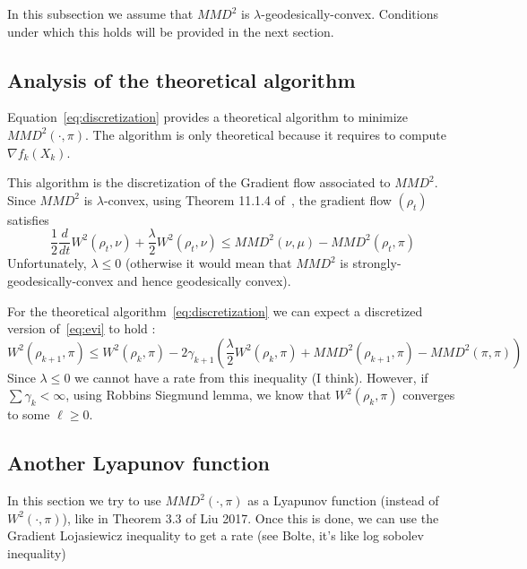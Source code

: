 In this subsection we assume that $MMD^2$ is $\lambda$-geodesically-convex. Conditions under which this holds will be provided in the next section.

\subsection{Analysis of the theoretical algorithm}

Equation~\eqref{eq:discretization} provides a theoretical algorithm to minimize $MMD^2(\cdot,\pi)$. The algorithm is only theoretical because it requires to compute $\nabla f_k(X_k)$.

This algorithm is the discretization of the Gradient flow associated to $MMD^2$. Since $MMD^2$ is $\lambda$-convex, using Theorem 11.1.4 of~\cite{ambrosio2008gradient}, the gradient flow $(\rho_t)$ satisfies
\begin{equation}
    \label{eq:evi}
    \frac12 \frac{d}{dt} W^2(\rho_t,\nu) + \frac{\lambda}{2}W^2(\rho_t,\nu) \leq MMD^2(\nu,\mu) - MMD^2(\rho_t,\pi)
\end{equation}
Unfortunately, $\lambda \leq 0$ (otherwise it would mean that $MMD^2$ is strongly-geodesically-convex and hence geodesically convex).

For the theoretical algorithm~\eqref{eq:discretization} we can expect a discretized version of~\eqref{eq:evi} to hold : 
\begin{equation}
    \label{eq:evi-discrete}
    W^2(\rho_{k+1},\pi) \leq  W^2(\rho_{k},\pi) -2\gamma_{k+1}\left( \frac{\lambda}{2}W^2(\rho_{k},\pi) + MMD^2(\rho_{k+1},\pi) - MMD^2(\pi,\pi)\right)
\end{equation}
Since $\lambda \leq 0$ we cannot have a rate from this inequality (I think).
However, if $\sum \gamma_k < \infty$, using Robbins Siegmund lemma, we know that $W^2(\rho_{k},\pi)$ converges to some $\ell \geq 0$. 

\subsection{Another Lyapunov function}

In this section we try to use $MMD^2(\cdot,\pi)$ as a Lyapunov function (instead of $W^2(\cdot,\pi)$), like in Theorem 3.3 of Liu 2017. Once this is done, we can use the Gradient Lojasiewicz inequality to get a rate (see Bolte, it's like log sobolev inequality)

